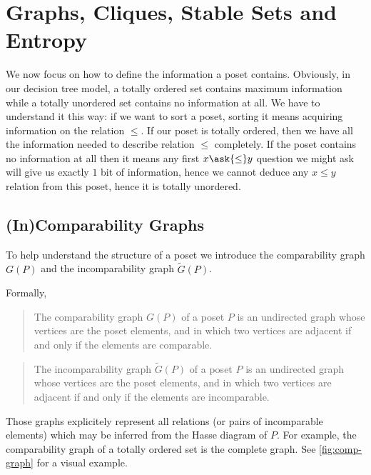 \section{Graphs, Cliques, Stable Sets and Entropy}
\label{tree:poset:graph}

We now focus on how to define the information a poset contains. Obviously, in
our decision tree model, a totally ordered set contains maximum information
while a totally unordered set contains no information at all. We have to
understand it this way: if we want to sort a poset, sorting it means acquiring
information on the relation $\le$. If our poset is totally ordered, then we
have all the information needed to describe relation $\le$ completely. If the
poset contains no information at all then it means any first $x
\ask{\le} y$ question we might ask will give us exactly $1$ bit of
information, hence we cannot deduce any $x \le y$ relation from this poset,
hence it is totally unordered.

\subsection*{(In)Comparability Graphs}

To help understand the structure of a poset we introduce the comparability
graph ${G}(P)$ and the incomparability graph $\widetilde{G}(P)$.

Formally,

\begin{quotation}
The comparability graph ${G}(P)$ of a poset $P$ is an undirected graph whose
vertices are the poset elements, and in which two vertices are adjacent if and
only if the elements are comparable.
\end{quotation}

\begin{quotation}
The incomparability graph $\widetilde{G}(P)$ of a poset $P$ is an undirected
graph whose vertices are the poset elements, and in which two vertices are
adjacent if and only if the elements are incomparable.
\end{quotation}



Those graphs explicitely represent all relations (or pairs of incomparable
elements) which may be inferred from the Hasse diagram of ${P}$. For example,
the comparability graph of a totally ordered set is the complete graph. See
\ref{fig:comp-graph} for a visual example.



